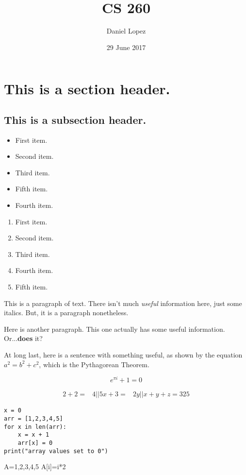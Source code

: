 \documentclass{article}
\begin{document}
\title{CS 260}
\author{Daniel Lopez}
\maketitle

\date{29 June 2017}

\section{This is a section header.}

\subsection{This is a subsection header.}

\begin{itemize}
	\item First item.
	\item Second item.
	\item Third item.
	\item Fifth item.
	\item Fourth item.
\end{itemize}

\begin{enumerate}
	\item First item.
	\item Second item.
	\item Third item.
	\item Fourth item.
	\item Fifth item.
\end{enumerate}

This is a paragraph of text. There isn't much \textit{useful} information here, just some italics. But, it is a paragraph nonetheless.\par
Here is another paragraph. This one actually has some useful information. Or...\textbf{does} it?\par

At long last, here is a sentence with something useful, as shown by the equation $a^2 = b^2 + c^2$, which is the Pythagorean Theorem.\par

\begin{equation}
e^{\pi i} + 1 = 0
\end{equation}

\begin{align}
	2+2=&4
	||
	5x+3=&2y
	||
	x+y+z=325
\end{align}

\begin{lstlisting}
x = 0
arr = [1,2,3,4,5]
for x in len(arr):
	x = x + 1
	arr[x] = 0
print("array values set to 0")
\end{lstlisting}

\begin{algorithm}[H]
	A=1,2,3,4,5\;
	{
		A[i]=i*2
	}
\end{algorithm}
\end{document}
